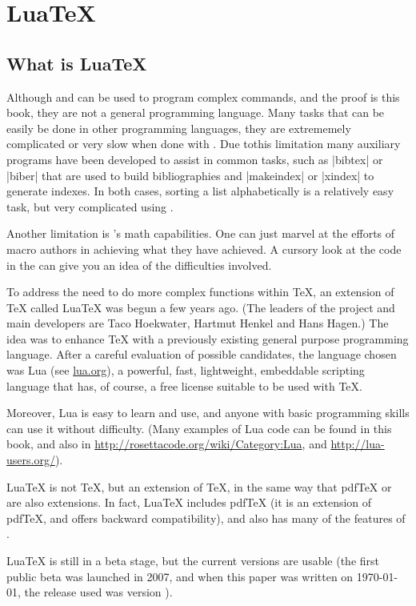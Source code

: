 \chapter{LuaTeX}

\section{What is LuaTeX}

Although \tex and \latex can be used to program complex commands, and the proof is this book, they are not a general programming language. Many tasks that can be easily be done
in other programming languages, they are extrememely complicated or very slow when done with \tex. Due tothis limitation many auxiliary programs have been developed to assist in common tasks, such as |bibtex| or |biber| that are used to build bibliographies and |makeindex| or |xindex| to generate indexes. In both cases, sorting a list alphabetically is a relatively easy task, but very complicated using \tex.


Another limitation is \tex's math capabilities. One can just marvel at the efforts of \tex macro authors in achieving what they have achieved. A cursory look at the code in the  can give you an idea of the difficulties involved.

To address the need to do more complex functions within \TeX, an extension of \TeX{} called Lua\TeX{} was begun a few years ago.  
(The leaders of the project and main developers are Taco Hoekwater, Hartmut Henkel and Hans Hagen.) The idea was to enhance \TeX{} with a previously existing general purpose programming language. After a careful evaluation of possible candidates, the language chosen was Lua (see \href{http://www.lua.org/}{lua.org}), a powerful, fast, lightweight, embeddable scripting language that has,  of course, a free license suitable to be used with \TeX.

Moreover, Lua is easy to learn and use, and anyone with basic programming skills can use it without difficulty. (Many examples of Lua code can be found in this book, and also in \url{http://rosettacode.org/wiki/Category:Lua},
and \url{http://lua-users.org/}).

Lua\TeX{} is not \TeX{}, but an extension of \TeX{}, in the same way that pdf\TeX{} or \XeTeX{} are also extensions.
In fact, Lua\TeX{} includes pdf\TeX{} (it is an extension of pdf\TeX{}, and offers backward compatibility), 
and also has many of the features of \XeTeX.

Lua\TeX{} is still in a beta stage, but the current versions are usable (the first public beta was launched in 2007,
and when this paper was written on \today, the release used was version \the\luatexversion). 

